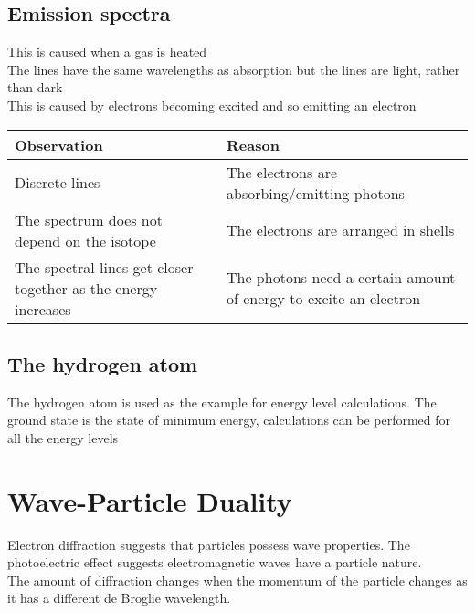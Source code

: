 \documentclass{article}[18pt]
\begin{document}
\subsection{Emission spectra}
This is caused when a gas is heated\\
The lines have the same wavelengths as absorption but the lines are light, rather than dark\\
This is caused by electrons becoming excited and so emitting an electron\\
\begin{tabularx}{\textwidth}{|X|X|}
\hline
\textbf{Observation}&\textbf{Reason}\\
\hline
Discrete lines&The electrons are absorbing/emitting photons\\
\hline
The spectrum does not depend on the isotope&The electrons are arranged in shells\\
\hline
The spectral lines get closer together as the energy increases&The photons need a certain amount of energy to excite an electron\\
\hline
\end{tabularx}
\subsection{The hydrogen atom}
The hydrogen atom is used as the example for energy level calculations. The ground state is the state of minimum energy, calculations can be performed for all the energy levels
\section{Wave-Particle Duality}
Electron diffraction suggests that particles possess wave properties. The photoelectric effect suggests electromagnetic waves have a particle nature.\\
The amount of diffraction changes when the momentum of the particle changes as it has a different de Broglie wavelength.
\end{document}
